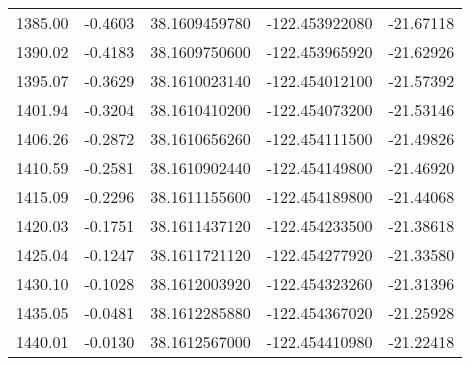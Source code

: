 \begin{scriptsize}
\begin{longtable}{p{2.5cm}p{2.5cm}p{3cm}p{3cm}p{2.5cm}}
          1385.00  & 	-0.4603 &               38.1609459780  &   -122.453922080   &	-21.67118 \\
          1390.02  & 	-0.4183 &               38.1609750600  &   -122.453965920   &	-21.62926 \\
          1395.07  & 	-0.3629 &               38.1610023140  &   -122.454012100   &	-21.57392 \\
          1401.94  & 	-0.3204 &               38.1610410200  &   -122.454073200   &	-21.53146 \\
          1406.26  & 	-0.2872 &               38.1610656260  &   -122.454111500   &	-21.49826 \\
          1410.59  & 	-0.2581 &               38.1610902440  &   -122.454149800   &	-21.46920 \\
          1415.09  & 	-0.2296 &               38.1611155600  &   -122.454189800   &	-21.44068 \\
          1420.03  & 	-0.1751 &               38.1611437120  &   -122.454233500   &	-21.38618 \\
          1425.04  & 	-0.1247 &               38.1611721120  &   -122.454277920   &	-21.33580 \\
          1430.10  & 	-0.1028 &               38.1612003920  &   -122.454323260   &	-21.31396 \\
          1435.05  & 	-0.0481 &               38.1612285880  &   -122.454367020   &	-21.25928 \\
          1440.01  & 	-0.0130 &               38.1612567000  &   -122.454410980   &	-21.22418 \\ \bottomrule
         
    \end{longtable}
\end{scriptsize}

